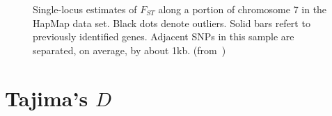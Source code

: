 \begin{figure}
\begin{center}
\end{center}
\caption{Single-locus estimates of $F_{ST}$ along a portion of
  chromosome 7 in the HapMap data set. Black dots denote
  outliers. Solid bars refert to previously identified genes. Adjacent
  SNPs in this sample are separated, on average, by about
  1kb. (from~\cite{Guo-etal-2009})}\label{fig:high-res-SNP}
\end{figure}

\section*{Tajima's $D$}

